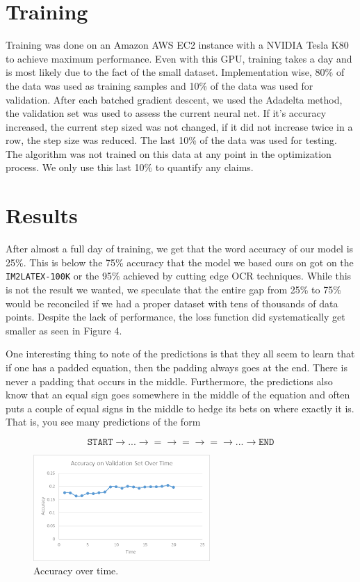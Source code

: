 \documentclass{article}
\begin{document}
\section*{Training}

Training was done on an Amazon AWS EC2 instance with a NVIDIA Tesla K80 to achieve
maximum performance. Even with this GPU, training takes a day and is most likely due to
the fact of the small dataset. Implementation wise, 80\% of the data was used as training
samples and 10\% of the data was used for validation. After each batched gradient descent, we used the Adadelta method, the
validation set was used to assess the current neural net. If it's accuracy increased,
the current step sized was not changed, if it did not increase twice in a row, the step size
was reduced. The last 10\% of the data was used for testing. The algorithm was not trained on this
data at any point in the optimization process. We only use this last 10\% to quantify
any claims.

\section*{Results}

After almost a full day of training, we get that the word accuracy of our model is
25\%. This is below the 75\% accuracy that the model we based ours on got on the
\texttt{IM2LATEX-100K} or the 95\% achieved by cutting edge OCR techniques. While
this is not the result we wanted, we speculate that the entire gap from 25\% to
75\% would be reconciled if we had a proper dataset with tens of thousands of data points.
Despite the lack of performance, the loss function did systematically get smaller as seen
in Figure 4.

One interesting thing to note of the predictions is that they all seem to learn
that if one has a padded equation, then the padding always goes at the end. There
is never a padding that occurs in the middle. Furthermore, the predictions also know
that an equal sign goes somewhere in the middle of the equation and often puts a couple
of equal signs in the middle to hedge its bets on where exactly it is. That is, you see
many predictions of the form

$$
  \texttt{START} \rightarrow ... \rightarrow = \rightarrow = \rightarrow = \rightarrow ... \rightarrow \texttt{END}
$$

\begin{figure}[h]
  \centering
  \includegraphics[width=0.6\textwidth]{accuracy.png}
  \caption{Accuracy over time.}
\end{figure}
\end{document}
